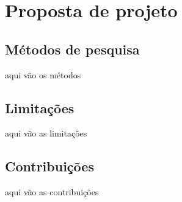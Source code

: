\chapter{Proposta de projeto}

\section{Métodos de pesquisa}

aqui vão os métodos

\section{Limitações}

aqui vão as limitações

\section{Contribuições}

aqui vão as contribuições


